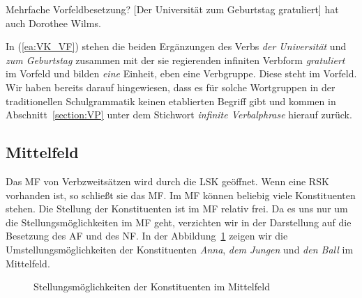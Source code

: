 \begin{Exkurs}{Mehrfache Vorfeldbesetzung?}
\ea\label{ea:VK_VF} [Der Universität zum Geburtstag gratuliert] hat auch Dorothee Wilms.
\z  

In (\ref{ea:VK_VF}) stehen die beiden Ergänzungen des Verbs \textit{der Universität} und \textit{zum Geburtstag} zusammen mit der sie regierenden infiniten Verbform \textit{gratuliert} im Vorfeld und bilden \textit{eine} Einheit, eben eine Verbgruppe. Diese steht im Vorfeld. Wir haben bereits darauf hingewiesen, dass es für solche Wortgruppen in der traditionellen Schulgrammatik keinen etablierten Begriff gibt und kommen in Abschnitt~\ref{section:VP} unter dem Stichwort \textit{infinite Verbalphrase} hierauf zurück. 


\end{Exkurs}

\subsection{Mittelfeld}\label{subsection:Mittelfeld}

Das MF von Verbzweitsätzen wird durch die LSK geöffnet. Wenn eine RSK vorhanden ist, so schließt sie das MF. Im MF können beliebig viele Konstituenten stehen. Die Stellung der Konstituenten ist im MF relativ frei. Da es uns nur um die Stellungsmöglichkeiten im MF geht, verzichten wir in der Darstellung auf die Besetzung des AF und des NF. In der Abbildung~\ref{fig:Mittelfeldstellungen} zeigen wir die Umstellungsmöglichkeiten der Konstituenten \textit{Anna}, \textit{dem Jungen} und \textit{den Ball} im Mittelfeld.


\begin{figure}[!htbp]
  \centering
  \caption{Stellungsmöglichkeiten der Konstituenten im Mittelfeld}
  \label{fig:Mittelfeldstellungen}
\end{figure}

